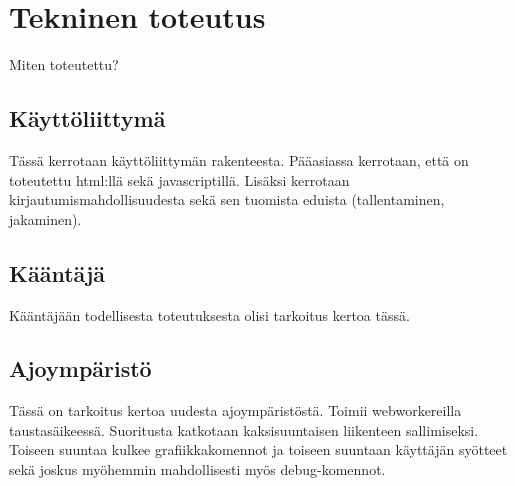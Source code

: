 
\section{Tekninen toteutus}
Miten toteutettu?

\subsection{Käyttöliittymä}
Tässä kerrotaan käyttöliittymän rakenteesta.
Pääasiassa kerrotaan, että on toteutettu html:llä sekä javascriptillä.
Lisäksi kerrotaan kirjautumismahdollisuudesta sekä
sen tuomista eduista (tallentaminen, jakaminen).
	
\subsection{Kääntäjä}
Kääntäjään todellisesta toteutuksesta olisi tarkoitus kertoa tässä.

\subsection{Ajoympäristö}
Tässä on tarkoitus kertoa uudesta ajoympäristöstä.
Toimii webworkereilla taustasäikeessä.
Suoritusta katkotaan kaksisuuntaisen liikenteen sallimiseksi.
Toiseen suuntaa kulkee grafiikkakomennot ja toiseen suuntaan
käyttäjän syötteet sekä joskus myöhemmin mahdollisesti
myös debug-komennot.